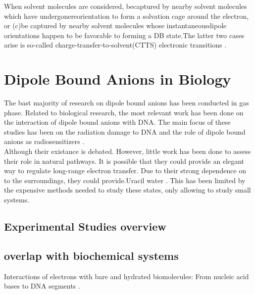 When solvent molecules are considered, becaptured by nearby solvent molecules which have undergonereorientation to form a solvation cage around the electron, or (c)be captured by nearby solvent molecules whose instantaneousdipole orientations happen to be favorable to forming a DB state.The latter two cases arise is so-called charge-transfer-to-solvent(CTTS) electronic transitions \cite{bradforth2002excited,chen2000precursors}.

\section{Dipole Bound Anions in Biology}
The bast majority of research on dipole bound anions has been conducted in gas phase. Related to biological research, the most relevant work has been done on the interaction of dipole bound anions with DNA. The main focus of these studies has been on the radiation damage to DNA \cite{narayanan2023secondary} and the role of dipole bound anions as radiosensitizers \cite{sedmidubska2024interaction}. \\
Although their existance is debated\cite{anusiewicz2020fate}.
However, little work has been done to assess their role in natural pathways. It is possible that they could provide an elegant way to regulate long-range electron transfer. Due to their strong dependence on to the surroundings, they could provide.Uracil water \cite{clarke2025role}.
This has been limited by the expensive methods needed to study these states, only allowing to study small systems.\\
\subsection{Experimental Studies overview}
\subsection{overlap with biochemical systems}
Interactions of electrons with bare and hydrated biomolecules: From nucleic acid bases to DNA segments \cite{gu2012interactions}.

